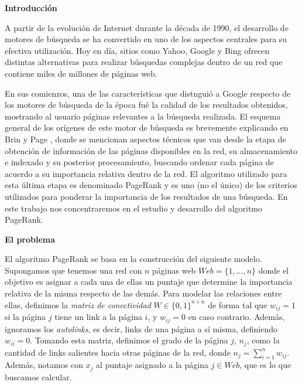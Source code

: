 \textbf{Introducci\'on}

A partir de la evoluci\'on de Internet durante la d\'ecada de 1990, el desarrollo de motores de b\'usqueda se ha convertido
en uno de los aspectos centrales para su efectiva utilizaci\'on. Hoy en d\'ia, sitios como Yahoo, Google y Bing ofrecen
distintas alternativas para realizar b\'usquedas complejas dentro de un red que contiene miles de millones de p\'aginas
web. 

En sus comienzos, una de las caracter\'isticas que distngui\'o a Google respecto de los motores de b\'usqueda de la \'epoca
fu\'e la calidad de los resultados obtenidos, mostrando al usuario p\'aginas relevantes a la
b\'usqueda realizada. El esquema general de los or\'igenes de este motor de b\'usqueda es brevemente explicando en 
Brin y Page \cite{Brin1998}, donde se mencionan aspectos t\'ecnicos que van desde la etapa de obtenci\'on de
informaci\'on de las p\'aginas disponibles en la red, su almacenamiento e indexado y su posterior procesamiento,
buscando ordenar cada p\'agina de acuerdo a su importancia relativa dentro de la red. El algoritmo utilizado para esta
\'ultima etapa es denominado PageRank y es uno (no el \'unico) de los criterios utilizados para ponderar la importancia
de los resultados de una b\'usqueda. En este trabajo nos concentraremos en el estudio y desarrollo del algoritmo
PageRank.

\textbf{El problema}

El algoritmo PageRank se basa en la construcci\'on del siguiente modelo. Supongamos que tenemos una red con $n$ p\'aginas 
web $Web = \{1,\dots,n\}$ donde
el objetivo es asignar a cada una de ellas un puntaje que determine la importancia relativa de la misma respecto de las
dem\'as. Para modelar las relaciones entre ellas, definimos la \emph{matriz de conectividad} $W \in \{0,1\}^{n \times n}$ 
de forma tal que $w_{ij} = 1$ si la p\'agina $j$ tiene un link a la p\'agina $i$, y $w_{ij} = 0$ en caso contrario. 
Adem\'as, ignoramos los \emph{autolinks}, es decir, links de una p\'agina a s\'i misma, definiendo $w_{ii} = 0$. Tomando 
esta matriz, definimos el grado de la p\'agina $j$, $n_j$, como la cantidad de links salientes hacia otras p\'aginas 
de la red, donde $n_j = \sum_{i = 1}^n w_{ij}$. Adem\'as, notamos con $x_j$ al puntaje asignado a la p\'agina $j\in
Web$, que es lo que buscamos calcular.

